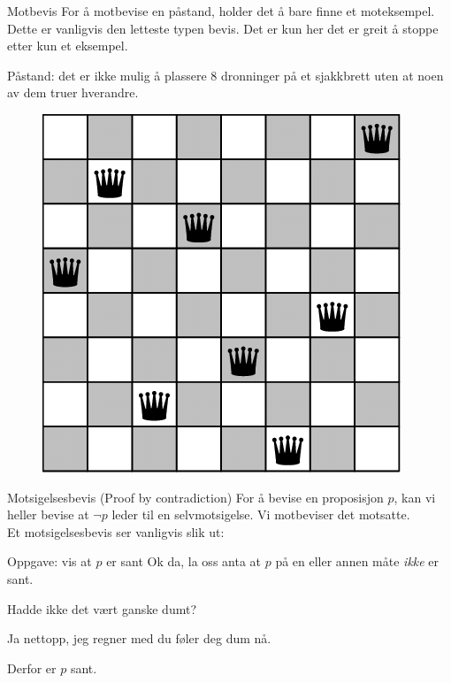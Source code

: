 \begin{frame}{Motbevis}
    For å motbevise en påstand, holder det å bare finne et moteksempel. Dette er vanligvis den letteste typen bevis. Det er kun her det er greit å stoppe etter kun et eksempel.
    \pause
    \begin{block}{Påstand: det er ikke mulig å plassere 8 dronninger på et sjakkbrett uten at noen av dem truer hverandre.}
    \pause
    \begin{figure}
        \centering
        \includegraphics[scale=0.20]{images/8 queens.png}
        \label{fig:my_label}
    \end{figure}
    \end{block}
\end{frame}

\begin{frame}{Motsigelsesbevis (Proof by contradiction)}
    For å bevise en proposisjon $p$, kan vi heller bevise at $\lnot p$ leder til en selvmotsigelse. 
    Vi motbeviser det motsatte.\\

    \pause
    Et motsigelsesbevis ser vanligvis slik ut:
    \begin{block}{Oppgave: vis at $p$ er sant}
        \pause
        Ok da, la oss anta at $p$ på en eller annen måte \emph{ikke} er sant.

        \pause
        Hadde ikke det vært ganske dumt?

        \pause
        Ja nettopp, jeg regner med du føler deg dum nå.

        \pause
        Derfor er $p$ sant.
    \end{block}
\end{frame}

